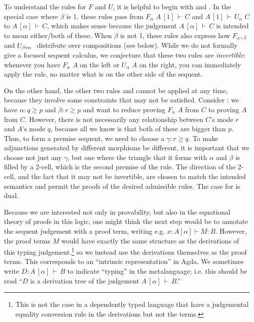 \documentclass{drl-common/llncs}
\newcommand\compo[2]{\ensuremath{#1 \circ #2}}
\newcommand\F[2]{\ensuremath{F_{#1} \,\, #2}}
\newcommand\U[2]{\ensuremath{U_{#1} \,\, #2}}
\newcommand\seq[3]{\ensuremath{#1 \, [ #2 ] \, \vdash \, #3}}
\renewcommand\irl[1]{\dsd{#1}}
\begin{document}
To understand the rules for $F$ and $U$, it is helpful to begin with
\irl{FL} and \irl{UR}.  In the special case where $\beta$ is 1, these
rules pass from \seq{\F {\alpha}{A}}{1}{C} and \seq{A}{1}{\U{\alpha}{C}}
to \seq{A}{\alpha}{C}, which makes sense because the judgement
\seq{A}{\alpha}{C} is intended to mean either/both of these.  When
$\beta$ is not 1, these rules also express how
$\F{\compo{\alpha}{\beta}}{}$ and $\U{\compo{\beta}{\alpha}}$ distribute
over compositions (see below).  While we do not formally give a focused
sequent calculus, we conjecture that these two rules are
\emph{invertible}: whenever you have \F{\alpha}{A} on the left or
\U{\alpha}{A} on the right, you can immediately apply the rule, no
matter what is on the other side of the sequent.

On the other hand, the other two rules \irl{UL} and \irl{FR} cannot be
applied at any time, because they involve some constraints that may not
be satisfied.  Consider \irl{FR}: we have $\alpha : q \ge p$ and $\beta
: r \ge p$ and want to reduce proving \F{\alpha}{A} from $C$ to proving
$A$ from $C$.  However, there is not necessarily any relationship
between $C$'s mode $r$ and $A$'s mode $q$, because all we know is that
both of these are bigger than $p$.  Thus, to form a premise sequent, we
need to choose a $\gamma : r \ge q$.  To make adjunctions generated by
different morphisms be different, it is important that we choose not
just any $\gamma$, but one where the triangle that it forms with
$\alpha$ and $\beta$ is filled by a 2-cell, which is the second premise
of the rule.  The direction of the 2-cell, and the fact that it may not
be invertible, are chosen to match the intended semantics and permit the
proofs of the desired admissible rules.  The case for \irl{UR} is dual.

Because we are interested not only in provability, but also in the
equational theory of proofs in this logic, one might think the next step
would be to annotate the sequent judgement with a proof term, writing
e.g. $x : A [ \alpha ] \vdash M : B$.  However, the proof terms $M$
would have exactly the same structure as the derivations of this typing
judgement.\footnote{This is not the case in a dependently typed language
  that have a judgemental equality conversion rule in the derivations
  but not the terms.} so we instead use the derivations themselves as
the proof terms.  This corresponds to an ``intrinsic representation'' in
Agda.  We sometimes write $D : \seq{A}{\alpha}{B}$ to indicate
``typing'' in the metalanguage; i.e. this should be read ``$D$ is a
derivation tree of the judgement \seq{A}{\alpha}{B}.''
\end{document}

